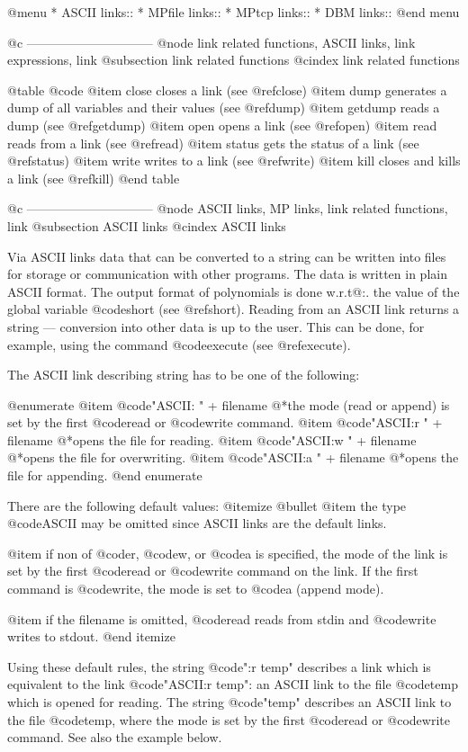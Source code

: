 {{{{{{@menu
* ASCII links::
* MPfile links::
* MPtcp links::
* DBM links::
@end menu

@c ------------------------------
@node link related functions, ASCII links, link expressions, link
@subsection link related functions
@cindex link related functions

@table @code
@item close
closes a link (see @ref{close})
@item dump
generates a dump of all variables and their values (see @ref{dump})
@item getdump
reads a dump (see @ref{getdump})
@item open
opens a link (see @ref{open})
@item read
reads from a link (see @ref{read})
@item status
gets the status of a link (see @ref{status})
@item write
writes to a link (see @ref{write})
@item kill
closes and kills a link (see @ref{kill})
@end table

@c ------------------------------
@node ASCII links, MP links, link related functions, link
@subsection ASCII links
@cindex ASCII links

Via ASCII links data that can be converted to a string can be written
into files for storage or communication with other programs. The data is
written in plain ASCII format. The output format of polynomials is done
w.r.t@:. the value of the global variable @code{short} (see @ref{short}).
Reading from an ASCII link returns a string --- conversion into other data
is up to the user. This can be done, for example,
using the command @code{execute}
(see @ref{execute}).

The ASCII link describing string has to be one of the following:

@enumerate
@item @code{"ASCII: "} + filename
@*the mode (read or append) is set by the first @code{read} or
@code{write} command.
@item @code{"ASCII:r "} + filename
@*opens the file for reading.
@item @code{"ASCII:w "} + filename
@*opens the file for overwriting.
@item @code{"ASCII:a "} + filename
@*opens the file for appending.
@end enumerate

There are the following default values:
@itemize @bullet
@item the type @code{ASCII} may be omitted since ASCII links are the
default links.

@item if non of @code{r}, @code{w}, or @code{a} is specified, the mode of
the link is set by the first @code{read} or @code{write} command on the
link. If the first command is @code{write}, the mode is set to @code{a}
(append mode).

@item if the filename is omitted, @code{read} reads from stdin and
@code{write} writes to stdout.
@end itemize

Using these default rules, the string @code{":r temp"} describes a link
which is equivalent to the link @code{"ASCII:r temp"}: an ASCII link to
the file @code{temp} which is opened for reading. The string
@code{"temp"} describes an ASCII link to the file @code{temp}, where the
mode is set by the first @code{read} or @code{write} command. See also
the example below.

}}}}}}
